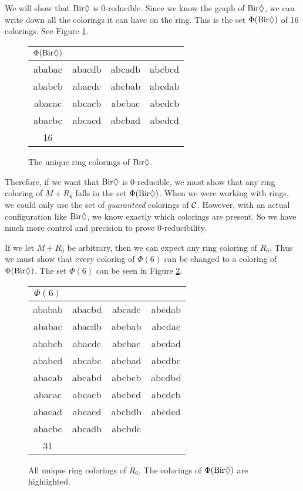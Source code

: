 We will show that $\text{Bir}\Diamond$ is 0-reducible. Since we know the graph of $\text{Bir}\Diamond$, we can write down all the colorings it can have on the ring. This is the set $\Phi(\text{Bir}\Diamond)$ of 16 colorings. See Figure \ref{table:diamondphi0}.

\needspace{2cm}
\begin{figure}[!ht]
    \centering
    \begin{tabular}{ cccc }
        $\Phi(\text{Bir}\Diamond) $ & \\
        \hline
        ababac & abacdb & abcadb & abcbcd \\
        ababcb & abacdc & abcbab & abcdab \\ 
        abacac & abcacb & abcbac & abcdcb \\
        abacbc & abcacd & abcbad & abcdcd \\
        \hline
        16 & \\
    \end{tabular}
    \caption{The unique ring colorings of $\text{Bir}\Diamond$.}
    \label{table:diamondphi0}
\end{figure}

\needspace{1cm}
Therefore, if we want that $\text{Bir}\Diamond$ is 0-reducible, we must show that any ring coloring of $M+R_6$ falls in the set $\Phi(\text{Bir}\Diamond)$. When we were working with rings, we could only use the set of \textit{guaranteed} colorings of $\mathcal{C}$. However, with an actual configuration like $\text{Bir}\Diamond$, we know exactly which colorings are present. So we have much more control and precision to prove 0-reducibility.

If we let $M+R_6$ be arbitrary, then we can expect any ring coloring of $R_6$. Thus we must show that every coloring of $\Phi(6)$ can be changed to a coloring of $\Phi(\text{Bir}\Diamond)$. The set $\Phi(6)$ can be seen in Figure \ref{table:colsring6}.

\begin{figure}[!ht]
    \centering
    \begin{tabular}{ cccc }
        $\Phi(6) $ & \\
        \hline
        ababab & abacbd & abcadc &  \cellcolor{g0} abcdab \\
        \cellcolor{g0} ababac &  \cellcolor{g0} abacdb &  \cellcolor{g0} abcbab & abcdac \\
        \cellcolor{g0} ababcb &  \cellcolor{g0} abacdc &  \cellcolor{g0} abcbac & abcdad \\
        ababcd & abcabc &  \cellcolor{g0} abcbad & abcdbc \\
        abacab & abcabd & abcbcb & abcdbd \\
        \cellcolor{g0} abacac &  \cellcolor{g0} abcacb &  \cellcolor{g0} abcbcd &  \cellcolor{g0} abcdcb \\
        abacad &  \cellcolor{g0} abcacd & abcbdb &  \cellcolor{g0} abcdcd \\
        \cellcolor{g0} abacbc &  \cellcolor{g0} abcadb & abcbdc \\
        \hline
        31 & \\
    \end{tabular}
    \caption{All unique ring colorings of $R_6$. The colorings of $\Phi(\text{Bir}\Diamond)$ are highlighted. }
    \label{table:colsring6}
\end{figure}

